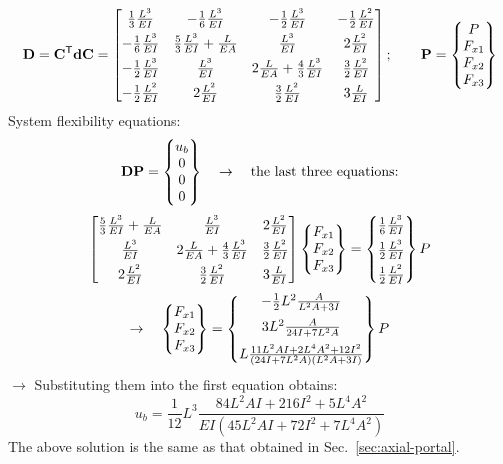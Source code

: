 \begin{example}[2D frame]
{\begin{equation*}
\end{equation*}
\begin{equation*}
  \mathbf{D} = \mathbf{C}^{\mathsf{T}}\mathbf{d}\mathbf{C} =
  \begin{bmatrix}
    \frac13\frac{L^3}{EI} & -\frac16\frac{L^3}{EI} & -\frac12\frac{L^3}{EI} & -\frac12\frac{L^2}{EI}\\[4pt]
    -\frac16\frac{L^3}{EI} & \frac53\frac{L^3}{EI}+\frac{L}{EA} & \frac{L^3}{EI} & 2\frac{L^2}{EI}\\[4pt]
    -\frac12\frac{L^3}{EI} & \frac{L^3}{EI} & 2\frac{L}{EA}+\frac43\frac{L^3}{EI} & \frac32\frac{L^2}{EI}\\[4pt]
    -\frac12\frac{L^2}{EI} & 2\frac{L^2}{EI} & \frac32\frac{L^2}{EI} & 3\frac{L}{EI}
  \end{bmatrix};\qquad
  \mathbf{P} = \begin{Bmatrix}P\\ F_{x1}\\ F_{x2}\\ F_{x3}\end{Bmatrix}
\end{equation*}}
System flexibility equations:
\begin{equation*}
  \mathbf{D}\mathbf{P} = \begin{Bmatrix}u_b\\ 0\\ 0\\ 0\end{Bmatrix}\quad\rightarrow\quad\text{the last three equations:}
\end{equation*}
\begin{equation*}
  \begin{bmatrix}
    \frac53\frac{L^3}{EI}+\frac{L}{EA} & \frac{L^3}{EI} & 2\frac{L^2}{EI}\\[4pt]
    \frac{L^3}{EI} & 2\frac{L}{EA}+\frac43\frac{L^3}{EI} & \frac32\frac{L^2}{EI}\\[4pt]
    2\frac{L^2}{EI} & \frac32\frac{L^2}{EI} & 3\frac{L}{EI}
  \end{bmatrix}\begin{Bmatrix}F_{x1}\\ F_{x2}\\ F_{x3}\end{Bmatrix} = \begin{Bmatrix}\frac16\frac{L^3}{EI}\\[4pt] \frac12\frac{L^3}{EI}\\[4pt] \frac12\frac{L^2}{EI}\end{Bmatrix}P
\end{equation*}
\begin{equation*}
  \rightarrow\quad \begin{Bmatrix}F_{x1}\\ F_{x2}\\ F_{x3}\end{Bmatrix} = \begin{Bmatrix}-\frac12L^2\frac{A}{L^2A+3I}\\[6pt] 3L^2\frac{A}{24I+7L^2A}\\[6pt] L\frac{11L^2AI+2L^4A^2+12I^2}{(24I+7L^2A)(L^2A+3I)}\end{Bmatrix}P
\end{equation*}
$\rightarrow$ Substituting them into the first equation obtains:
\begin{equation*}
  u_b = \frac{1}{12}L^3\frac{84L^2AI+216I^2+5L^4A^2}{EI(45L^2AI+72I^2+7L^4A^2)}
\end{equation*}
The above solution is the same as that obtained in Sec.~\ref{sec:axial-portal}.


\end{example}
